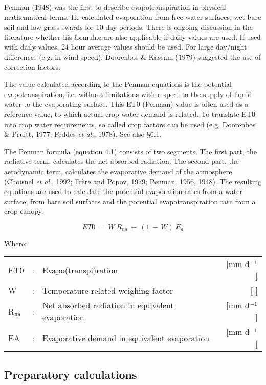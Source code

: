 Penman (1948) was the first to describe evapotranspiration in physi\-cal mathematical
terms. He calculated evaporation from free-water surfaces, wet bare soil and low grass
swards for 10-day periods. There is ongoing discussion in the literature whether his
formulae are also applicable if daily values are used. If used with daily values, 24 hour
average values should be used. For large day/night differences (e.g. in wind speed),
Dooren\-bos \& Kassam (1979) suggested the use of correction factors.

The value calculated according to the Penman equations is the potential evapotranspiration, i.e. without limitations with respect to the supply of liquid water to the
evaporating surface. This ET0 (Penman) value is often used as a reference value, to
which actual crop water demand is related. To translate ET0 into crop water require\-ments,
 so called crop factors can be used (e.g. Doorenbos \& Pruitt, 1977; Feddes {\it et al.},
1978). See also \S 6.1.

The Penman formula (equation 4.1) consists of two segments. The first part, the radiative
term, calculates the net absorbed radiation. The second part, the aerodynamic term,
calculates the evapora\-tive demand of the atmo\-sphere (Choisnel {\it et al}., 1992; Fr\`{e}re and
Popov, 1979; Penman, 1956, 1948). The resulting equations are used to calculate the
potential evapora\-tion rates from a water surface, from bare soil surfaces and the potential
evapotranspira\-tion rate from a crop canopy.


\begin{equation}
\label{eqET0}
ET0 ~=~ W ~R _{na} ~+~(1\, -\, W) ~E _{a} 
\end{equation}

Where:\\[5pt]
\begin{tabularx}{\textwidth}{llXr}
ET0&:& Evapo(transpi)ration & [mm d$^{{\rm -1}}$] \\
W&:& Temperature related weighing factor &  [-] \\
R$_{{\rm na}}$&: & Net absorbed radiation in equivalent evaporation & [mm d$^{{\rm -1}}$] \\
EA&: &  Evaporative demand in equivalent evaporation & [mm d$^{{\rm -1}}$] \\
\end{tabularx}

\subsection{Preparatory calculations}

